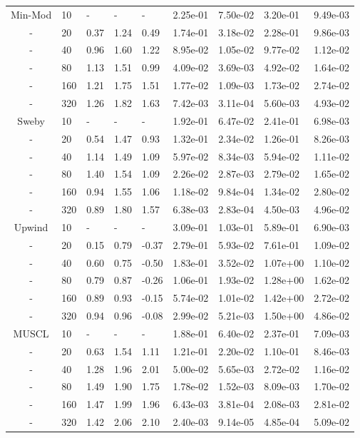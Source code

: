 \begin{table}[htbp]
{\begin{tabular}{cllllllll}
   \hline
    Min-Mod &  10 & - & - & - &  2.25e-01 & 7.50e-02 & 3.20e-01 & 9.49e-03\\ 
    - &  20 & 0.37 & 1.24 & 0.49 &  1.74e-01 & 3.18e-02 & 2.28e-01 & 9.86e-03\\ 
    - &  40 & 0.96 & 1.60 & 1.22 &  8.95e-02 & 1.05e-02 & 9.77e-02 & 1.12e-02\\ 
    - &  80 & 1.13 & 1.51 & 0.99 &  4.09e-02 & 3.69e-03 & 4.92e-02 & 1.64e-02\\ 
    - & 160 & 1.21 & 1.75 & 1.51 &  1.77e-02 & 1.09e-03 & 1.73e-02 & 2.74e-02\\ 
    - & 320 & 1.26 & 1.82 & 1.63 &  7.42e-03 & 3.11e-04 & 5.60e-03 & 4.93e-02\\ 
   \hline
    Sweby &  10 & - & - & - &  1.92e-01 & 6.47e-02 & 2.41e-01 & 6.98e-03\\ 
    - &  20 & 0.54 & 1.47 & 0.93 &  1.32e-01 & 2.34e-02 & 1.26e-01 & 8.26e-03\\ 
    - &  40 & 1.14 & 1.49 & 1.09 &  5.97e-02 & 8.34e-03 & 5.94e-02 & 1.11e-02\\ 
    - &  80 & 1.40 & 1.54 & 1.09 &  2.26e-02 & 2.87e-03 & 2.79e-02 & 1.65e-02\\ 
    - & 160 & 0.94 & 1.55 & 1.06 &  1.18e-02 & 9.84e-04 & 1.34e-02 & 2.80e-02\\ 
    - & 320 & 0.89 & 1.80 & 1.57 &  6.38e-03 & 2.83e-04 & 4.50e-03 & 4.96e-02\\ 
   \hline
    Upwind &  10 & - & - & - &  3.09e-01 & 1.03e-01 & 5.89e-01 & 6.90e-03\\ 
    - &  20 & 0.15 & 0.79 & -0.37&  2.79e-01 & 5.93e-02 & 7.61e-01 & 1.09e-02\\ 
    - &  40 & 0.60 & 0.75 & -0.50&  1.83e-01 & 3.52e-02 & 1.07e+00 & 1.10e-02\\ 
    - &  80 & 0.79 & 0.87 & -0.26&  1.06e-01 & 1.93e-02 & 1.28e+00 & 1.62e-02\\ 
    - & 160 & 0.89 & 0.93 & -0.15&  5.74e-02 & 1.01e-02 & 1.42e+00 & 2.72e-02\\ 
    - & 320 & 0.94 & 0.96 & -0.08&  2.99e-02 & 5.21e-03 & 1.50e+00 & 4.86e-02\\ 
   \hline
    MUSCL &  10 & - & - & - &  1.88e-01 & 6.40e-02 & 2.37e-01 & 7.09e-03\\ 
    - &  20 & 0.63 & 1.54 & 1.11 &  1.21e-01 & 2.20e-02 & 1.10e-01 & 8.46e-03\\ 
    - &  40 & 1.28 & 1.96 & 2.01 &  5.00e-02 & 5.65e-03 & 2.72e-02 & 1.16e-02\\ 
    - &  80 & 1.49 & 1.90 & 1.75 &  1.78e-02 & 1.52e-03 & 8.09e-03 & 1.70e-02\\ 
    - & 160 & 1.47 & 1.99 & 1.96 &  6.43e-03 & 3.81e-04 & 2.08e-03 & 2.81e-02\\ 
    - & 320 & 1.42 & 2.06 & 2.10 &  2.40e-03 & 9.14e-05 & 4.85e-04 & 5.09e-02\\ 
   \hline
   \end{tabular}
   }
\end{table}

